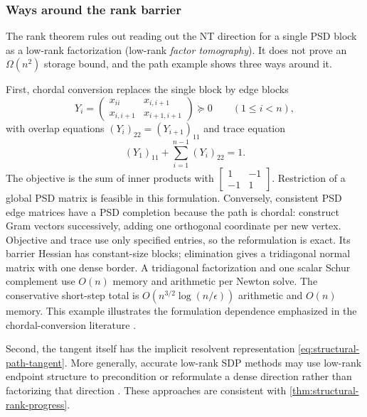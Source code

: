 \subsubsection{Ways around the rank barrier}
\label{sec:structural-rank-escapes}

The rank theorem rules out reading out the NT direction for a single PSD
block as a low-rank factorization (low-rank \emph{factor tomography}).  It does not prove an $\Omega(n^2)$
storage bound, and the path example shows three ways around it.

First, chordal conversion replaces the single block by edge blocks
\begin{equation}
 Y_i=\begin{pmatrix}x_{ii}&x_{i,i+1}\\x_{i,i+1}&x_{i+1,i+1}\end{pmatrix}
 \succeq0\qquad(1\leq i<n),                              \label{eq:structural-path-blocks}
\end{equation}
with overlap equations $(Y_i)_{22}=(Y_{i+1})_{11}$ and trace equation
\begin{equation}
 (Y_1)_{11}+\sum_{i=1}^{n-1}(Y_i)_{22}=1.                \label{eq:structural-path-local-trace}
\end{equation}
The objective is the sum of inner products with
$\left[\begin{smallmatrix}1&-1\\-1&1\end{smallmatrix}\right]$.
Restriction of a global PSD matrix is feasible in this formulation.
Conversely, consistent PSD edge matrices have a PSD completion because the
path is chordal: construct Gram vectors successively, adding one orthogonal
coordinate per new vertex.  Objective and trace use only specified entries,
so the reformulation is exact.  Its barrier Hessian has constant-size blocks;
elimination gives a tridiagonal normal matrix with one dense border.  A
tridiagonal factorization and one scalar Schur complement use $O(n)$ memory
and arithmetic per Newton solve.  The conservative short-step total is
$O(n^{3/2}\log(n/\epsilon))$ arithmetic and $O(n)$ memory.  This example
illustrates the formulation dependence emphasized in the
chordal-conversion literature \cite{zhang2024-complexity-of-chordal-conversion-for}.

Second, the tangent itself has the implicit resolvent representation
\eqref{eq:structural-path-tangent}.  More generally, accurate low-rank SDP
methods may use low-rank endpoint structure to precondition or reformulate a
dense direction rather than factorizing that direction
\cite{bellavia2021-a-relaxed-interior-point-method,
zhang2024-well-conditioned-primal-dual-interior}.  These approaches are
consistent with \cref{thm:structural-rank-progress}.

